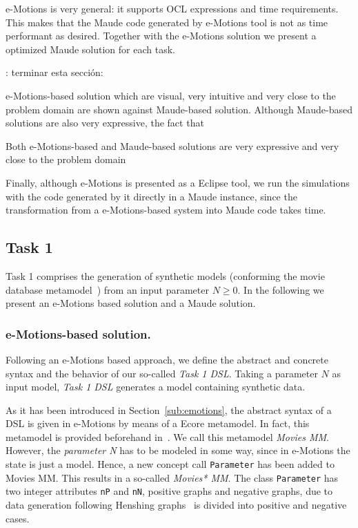\documentclass[draft]{llncs}
\newcommand{\todo}[1]{\textbf{\color{red}{TO-DO}}: #1}
\newcommand{\todo}[1]{}
\newcommand{\code}[1]{{\texttt{#1}}}
\begin{document}
e-Motions is very general: it supports OCL expressions and time requirements. This makes that the Maude code generated by e-Motions tool is not as time performant as desired. Together with the e-Motions solution we present a optimized Maude solution for each task. 


\todo{terminar esta sección:}

e-Motions-based solution which are visual, very intuitive and very close to the problem domain are shown against Maude-based solution. Although Maude-based solutions are also very expressive, the fact that  

Both e-Motions-based and Maude-based solutions are very expressive and very close to the problem domain

Finally, although e-Motions is presented as a Eclipse tool, we run the simulations with the code generated by it directly in a Maude instance, since the transformation from a e-Motions-based system into Maude code takes time.

\subsection{Task 1}\label{sub:task1}

Task 1 comprises the generation of synthetic models (conforming the movie database metamodel~\cite{imdbcase}) from an input parameter $N \geq 0$. In the following we present an e-Motions based solution and a Maude solution. 


\subsubsection{e-Motions-based solution.}

Following an e-Motions based approach, we define the abstract and concrete syntax and the behavior of our so-called \textit{Task 1 DSL}. Taking a parameter $N$ as input model, \textit{Task 1 DSL} generates a model containing synthetic data.

As it has been introduced in Section~\ref{sub:emotions}, the abstract syntax of a DSL is given in e-Motions by means of a Ecore metamodel. In fact, this metamodel is provided beforehand in~\cite{imdbsources}. We call this metamodel \textit{Movies MM}. However, the \textit{parameter N} has to be modeled in some way, since in e-Motions the state is just a model. Hence, a new concept call \code{Parameter} has been added to Movies MM. This results in a so-called \textit{Movies* MM}. The class \code{Parameter} has two integer attributes \code{nP} and \code{nN}, positive graphs and negative graphs, due to data generation following Henshing graphs~\cite{henshing} is divided into positive and negative cases.
\end{document}
